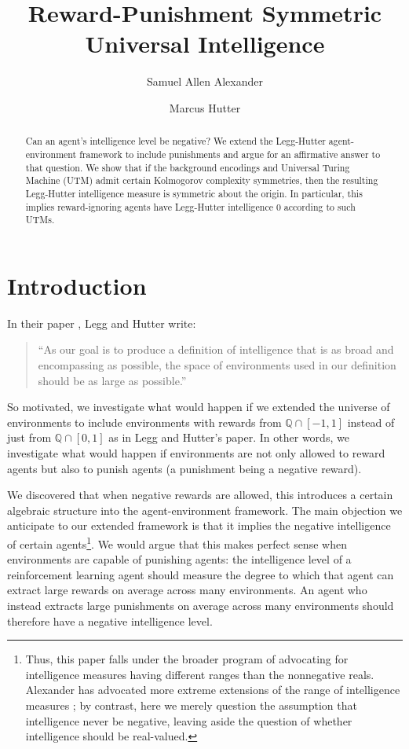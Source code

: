 \documentclass[runningheads]{llncs}
\title{Reward-Punishment Symmetric Universal Intelligence}
\author{Samuel Allen Alexander\inst{1}\orcidID{0000-0002-7930-110X}
\and
Marcus Hutter\inst{2}\orcidID{0000-0002-3263-4097}}
\institute{The U.S.\ Securities and Exchange Commission
\email{samuelallenalexander@gmail.com}
\url{https://philpeople.org/profiles/samuel-alexander/publications}
\and
Google DeepMind
\email{marcus.hutter@anu.edu.au}
\url{http://www.hutter1.net/}
}
\begin{document}
\maketitle

\begin{abstract}
    Can an agent's intelligence level be negative?
    We extend the Legg-Hutter agent-environment framework to include punishments
    and argue for an affirmative answer to that question.
    We show that if the background encodings and Universal Turing Machine (UTM) admit
    certain Kolmogorov complexity symmetries,
    then the resulting Legg-Hutter intelligence measure is symmetric about
    the origin. In particular, this implies reward-ignoring agents
    have Legg-Hutter intelligence $0$ according to such UTMs.
\end{abstract}

\section{Introduction}

In their paper \cite{legg2007universal}, Legg and Hutter write:
\begin{quote}
    ``As our goal is to produce a definition of intelligence that is as broad and
    encompassing as possible, the space of environments used in our definition should
    be as large as possible.''
\end{quote}
So motivated, we investigate what would happen if we extended the universe
of environments to include environments with rewards from $\mathbb Q\cap [-1,1]$
instead of just from $\mathbb Q\cap [0,1]$ as in Legg and Hutter's paper.
In other words, we investigate what would happen if environments are not only
allowed to reward agents but also to punish agents (a punishment being a negative
reward).

We discovered that when negative rewards are allowed, this
introduces a certain algebraic structure into the agent-environment framework. The
main objection we anticipate to our extended framework
is that it implies the negative intelligence of certain
agents\footnote{Thus, this paper falls under the broader
program of advocating for intelligence measures having different ranges than
the nonnegative reals. Alexander has advocated
more extreme extensions of the range of intelligence measures
\cite{alexander2020archimedean} \cite{alexander2021measuring}; by contrast,
here we merely question the
assumption that intelligence never be negative, leaving aside the
question of whether intelligence should be real-valued.}.
We would argue that this makes perfect sense when environments are capable of punishing
agents: the intelligence level of a reinforcement learning agent should measure the
degree to which that agent can extract large rewards on average across many environments.
An agent who instead extracts large punishments on average across many environments
should therefore have a negative intelligence level.
\end{document}
